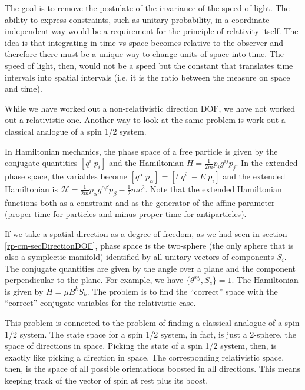 The goal is to remove the postulate of the invariance of the speed of light. The ability to express constraints, such as unitary probability, in a coordinate independent way would be a requirement for the principle of relativity itself. The idea is that integrating in time vs space becomes relative to the observer and therefore there must be a unique way to change units of space into time. The speed of light, then, would not be a speed but the constant that translates time intervals into spatial intervals (i.e. it is the ratio between the measure on space and time).

{While we have worked out a non-relativistic direction DOF, we have not worked out a relativistic one. Another way to look at the same problem is work out a classical analogue of a spin 1/2 system.}

In Hamiltonian mechanics, the phase space of a free particle
is given by the conjugate quantities $[ q^i \; p_i ]$ and the Hamiltonian
$H=\frac{1}{2m} p_i g^{ij}p_j$. In the extended phase space, the variables become
$[q^\alpha \; p_\alpha]=[ t \; q^i \; -E \; p_i]$ and the extended Hamiltonian is
$\mathcal{H}=\frac{1}{2m} p_\alpha g^{\alpha\beta}p_\beta - \frac{1}{2}mc^2$. Note that
the extended Hamiltonian functions both as a constraint and as the generator
of the affine parameter (proper time for particles and minus proper time
for antiparticles).

If we take a spatial direction as a degree of freedom, as we had seen in section \ref{rp-cm-secDirectionDOF}, phase space is the two-sphere (the only sphere that is also a symplectic manifold) identified by all
unitary vectors of components $S_i$. The conjugate quantities are given by the angle over a plane and the component perpendicular to the plane. For example, we have $\{\theta^{xy}, S_z\}=1$. The Hamiltonian
is given by $H=\mu B^{k}S_k$. The problem is to find the ``correct'' space with the ``correct'' conjugate variables
for the relativistic case.

This problem is connected to the problem of finding a classical analogue of a spin 1/2 system. The state space for a spin 1/2 system, in fact, is just a 2-sphere, the space of directions in space. Picking the state of a spin 1/2 system, then, is exactly like picking a direction in space. The corresponding relativistic space, then, is the space of all possible orientations boosted in all directions. This means keeping track of the vector of spin at rest plus its boost.

